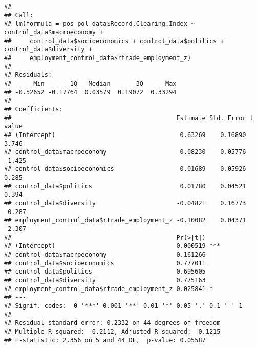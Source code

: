 \documentclass[
]{article}
\newenvironment{Shaded}{\begin{snugshade}}{\end{snugshade}}
\newcommand{\CommentTok}[1]{\textcolor[rgb]{0.56,0.35,0.01}{\textit{#1}}}
\newcommand{\FunctionTok}[1]{\textcolor[rgb]{0.13,0.29,0.53}{\textbf{#1}}}
\newcommand{\NormalTok}[1]{#1}
\newcommand{\OtherTok}[1]{\textcolor[rgb]{0.56,0.35,0.01}{#1}}
\newcommand{\SpecialCharTok}[1]{\textcolor[rgb]{0.81,0.36,0.00}{\textbf{#1}}}
\begin{document}
\begin{Shaded}
\end{Shaded}

\begin{verbatim}
## 
## Call:
## lm(formula = pos_pol_data$Record.Clearing.Index ~ control_data$macroeconomy + 
##     control_data$socioeconomics + control_data$politics + control_data$diversity + 
##     employment_control_data$rtrade_employment_z)
## 
## Residuals:
##      Min       1Q   Median       3Q      Max 
## -0.52652 -0.17764  0.03579  0.19072  0.33294 
## 
## Coefficients:
##                                             Estimate Std. Error t value
## (Intercept)                                  0.63269    0.16890   3.746
## control_data$macroeconomy                   -0.08230    0.05776  -1.425
## control_data$socioeconomics                  0.01689    0.05926   0.285
## control_data$politics                        0.01780    0.04521   0.394
## control_data$diversity                      -0.04821    0.16773  -0.287
## employment_control_data$rtrade_employment_z -0.10082    0.04371  -2.307
##                                             Pr(>|t|)    
## (Intercept)                                 0.000519 ***
## control_data$macroeconomy                   0.161266    
## control_data$socioeconomics                 0.777011    
## control_data$politics                       0.695605    
## control_data$diversity                      0.775163    
## employment_control_data$rtrade_employment_z 0.025841 *  
## ---
## Signif. codes:  0 '***' 0.001 '**' 0.01 '*' 0.05 '.' 0.1 ' ' 1
## 
## Residual standard error: 0.2332 on 44 degrees of freedom
## Multiple R-squared:  0.2112, Adjusted R-squared:  0.1215 
## F-statistic: 2.356 on 5 and 44 DF,  p-value: 0.05587
\end{verbatim}
\end{document}
